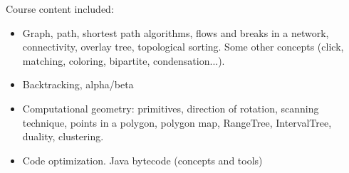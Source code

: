 Course content included:
\begin{itemize}
    \item Graph, path, shortest path algorithms, flows and breaks in a network, connectivity, overlay tree, topological sorting. Some other concepts (click, matching, coloring, bipartite, condensation...).
    \item Backtracking, alpha/beta
    \item Computational geometry: primitives, direction of rotation, scanning technique, points in a polygon, polygon map, RangeTree, IntervalTree, duality, clustering.
    \item Code optimization. Java bytecode (concepts and tools)
\end{itemize}